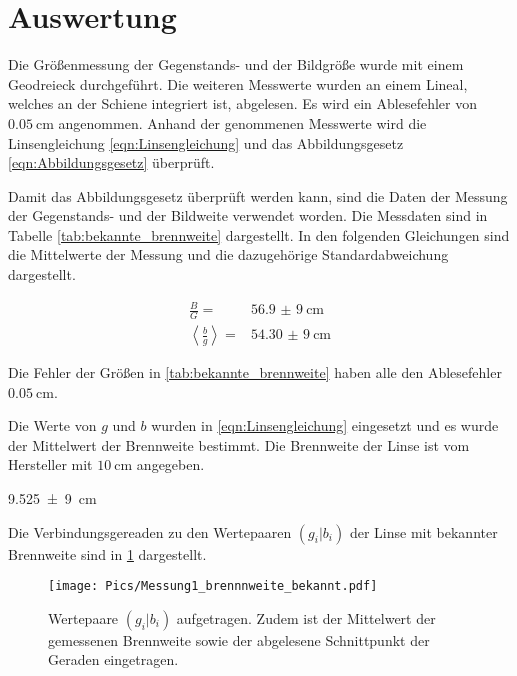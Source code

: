 \section{Auswertung}

Die Größenmessung der Gegenstands- und der Bildgröße wurde mit einem Geodreieck durchgeführt.
Die weiteren Messwerte wurden an einem Lineal, welches an der Schiene integriert
ist, abgelesen. Es wird ein Ablesefehler von $\SI{0,05}{\centi\meter}$ angenommen.
Anhand der genommenen Messwerte wird die Linsengleichung \eqref{eqn:Linsengleichung} und das
Abbildungsgesetz \eqref{eqn:Abbildungsgesetz} überprüft.

Damit das Abbildungsgesetz überprüft werden kann, sind die Daten der Messung
der Gegenstands- und der Bildweite verwendet worden.
Die Messdaten sind in Tabelle \ref{tab:bekannte_brennweite} dargestellt.
In den folgenden Gleichungen sind die Mittelwerte der Messung und die dazugehörige
Standardabweichung dargestellt.

\begin{align}
  \label{eqn:B/G}
  \frac{B}{G}=&\SI{56,9(9)}{\centi\meter} \\
  \label{eqn:b/g}
  \left<\frac{b}{g}\right>=&\SI{54,30(9)}{\centi\meter}
\end{align}



Die Fehler der Größen in \ref{tab:bekannte_brennweite} haben alle den Ablesefehler
$\SI{0,05}{\centi\meter}$.

Die Werte von $g$ und $b$ wurden in \eqref{eqn:Linsengleichung} eingesetzt und es wurde der Mittelwert der Brennweite bestimmt. Die Brennweite der Linse ist vom Hersteller mit $\SI{10}{\centi\meter}$
angegeben.

\begin{description}
  \centering
  \item[$<f_1>\ua{gemessen}=$]\SI{9,525(9)}{\centi\meter}
\end{description}

Die Verbindungsgereaden zu den Wertepaaren $(g_i|b_i)$ der Linse mit bekannter
Brennweite sind in \ref{fig:brennweite_bekannt}
dargestellt.

\begin{figure}
  \centering
  \texttt{[image: Pics/Messung1\_brennnweite\_bekannt.pdf]}
  \caption{Wertepaare $(g_i|b_i)$ aufgetragen. Zudem ist der Mittelwert der gemessenen Brennweite sowie der abgelesene Schnittpunkt der Geraden eingetragen.}
  \label{fig:brennweite_bekannt}
\end{figure}

